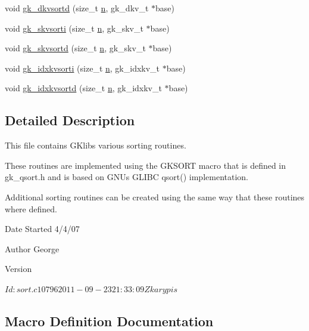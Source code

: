 \begin{DoxyCompactItemize}
\item 
void \hyperlink{a00140_ac8a7384657265b7085aa5a17b970e88e}{gk\+\_\+dkvsortd} (size\+\_\+t \hyperlink{a00623_a781a04ab095280f838ff3eb0e51312e0}{n}, gk\+\_\+dkv\+\_\+t $\ast$base)
\item 
void \hyperlink{a00140_ab75cbfb8dbe418fab354f124992d7c70}{gk\+\_\+skvsorti} (size\+\_\+t \hyperlink{a00623_a781a04ab095280f838ff3eb0e51312e0}{n}, gk\+\_\+skv\+\_\+t $\ast$base)
\item 
void \hyperlink{a00140_aa36cc3e92563f4f97c8e21f45728bf72}{gk\+\_\+skvsortd} (size\+\_\+t \hyperlink{a00623_a781a04ab095280f838ff3eb0e51312e0}{n}, gk\+\_\+skv\+\_\+t $\ast$base)
\item 
void \hyperlink{a00140_af0fa267ef67c10f98065915c6033f683}{gk\+\_\+idxkvsorti} (size\+\_\+t \hyperlink{a00623_a781a04ab095280f838ff3eb0e51312e0}{n}, gk\+\_\+idxkv\+\_\+t $\ast$base)
\item 
void \hyperlink{a00140_adf1ba87bf59cbb6c93372843224adbc7}{gk\+\_\+idxkvsortd} (size\+\_\+t \hyperlink{a00623_a781a04ab095280f838ff3eb0e51312e0}{n}, gk\+\_\+idxkv\+\_\+t $\ast$base)
\end{DoxyCompactItemize}


\subsection{Detailed Description}
This file contains G\+Klib\textquotesingle{}s various sorting routines. 

These routines are implemented using the G\+K\+S\+O\+RT macro that is defined in gk\+\_\+qsort.\+h and is based on G\+NU\textquotesingle{}s G\+L\+I\+BC qsort() implementation.

Additional sorting routines can be created using the same way that these routines where defined.

\begin{DoxyDate}{Date}
Started 4/4/07 
\end{DoxyDate}
\begin{DoxyAuthor}{Author}
George 
\end{DoxyAuthor}
\begin{DoxyVersion}{Version}
\begin{DoxyVerb}$Id: sort.c 10796 2011-09-23 21:33:09Z karypis $ \end{DoxyVerb}
 
\end{DoxyVersion}


\subsection{Macro Definition Documentation}
\mbox{\label{a00140_a1ea55be1c2ee6fd588668e9ac101b842}} 
